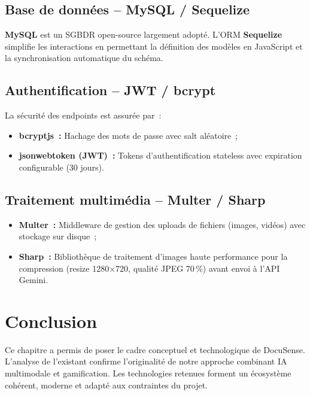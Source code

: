 \documentclass[12pt, a4paper, twoside, openany]{report}
\begin{document}
\subsection{Base de donn\'ees -- MySQL / Sequelize}

\textbf{MySQL} est un SGBDR open-source largement adopt\'e. L'ORM \textbf{Sequelize}
simplifie les interactions en permettant la d\'efinition des mod\`eles en JavaScript
et la synchronisation automatique du sch\'ema.

\subsection{Authentification -- JWT / bcrypt}

La s\'ecurit\'e des endpoints est assur\'ee par~:
\begin{itemize}
  \item \textbf{bcryptjs~:} Hachage des mots de passe avec salt al\'eatoire~;
  \item \textbf{jsonwebtoken (JWT)~:} Tokens d'authentification stateless avec
        expiration configurable (30 jours).
\end{itemize}

\subsection{Traitement multim\'edia -- Multer / Sharp}

\begin{itemize}
  \item \textbf{Multer~:} Middleware de gestion des uploads de fichiers (images,
        vid\'eos) avec stockage sur disque~;
  \item \textbf{Sharp~:} Biblioth\`eque de traitement d'images haute performance
        pour la compression (resize 1280$\times$720, qualit\'e JPEG 70\,\%) avant
        envoi \`a l'API Gemini.
\end{itemize}

\section{Conclusion}

Ce chapitre a permis de poser le cadre conceptuel et technologique de DocuSense.
L'analyse de l'existant confirme l'originalit\'e de notre approche combinant IA
multimodale et gamification. Les technologies retenues forment un \'ecosyst\`eme
coh\'erent, moderne et adapt\'e aux contraintes du projet.
\end{document}
